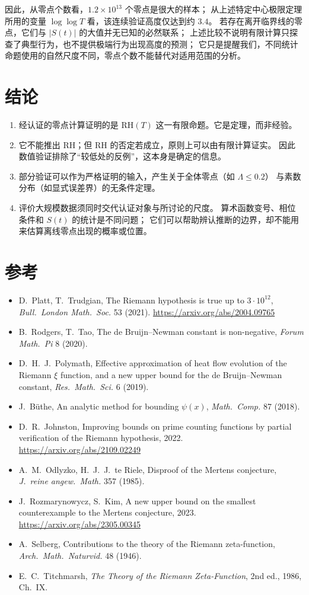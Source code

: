 \documentclass[11pt]{article}
\begin{document}
因此，从零点个数看，$1.2\times10^{13}$ 个零点是很大的样本；
从上述特定中心极限定理所用的变量 $\log\log T$ 看，该连续验证高度仅达到约 $3.4$。
若存在离开临界线的零点，它们与 $|S(t)|$ 的大值并无已知的必然联系；
上述比较不说明有限计算只探查了典型行为，也不提供极端行为出现高度的预测；
它只是提醒我们，不同统计命题使用的自然尺度不同，零点个数不能替代对适用范围的分析。

\section{结论}
\begin{enumerate}
 \item 经认证的零点计算证明的是 $\mathrm{RH}(T)$ 这一有限命题。它是定理，而非经验。
 \item 它不能推出 RH；但 RH 的否定若成立，原则上可以由有限计算证实。
 因此数值验证排除了“较低处的反例”，这本身是确定的信息。
 \item 部分验证可以作为严格证明的输入，产生关于全体零点（如 $\Lambda\le0.2$）
 与素数分布（如显式误差界）的无条件定理。
 \item 评价大规模数据须同时交代认证对象与所讨论的尺度。
 算术函数变号、相位条件和 $S(t)$ 的统计是不同问题；
 它们可以帮助辨认推断的边界，却不能用来估算离线零点出现的概率或位置。
\end{enumerate}

\section*{参考}
\begin{itemize}
 \item D.\ Platt, T.\ Trudgian, The Riemann hypothesis is true up to $3\cdot10^{12}$,
 \emph{Bull.\ London Math.\ Soc.} 53 (2021). \url{https://arxiv.org/abs/2004.09765}
 \item B.\ Rodgers, T.\ Tao, The de Bruijn--Newman constant is non-negative, \emph{Forum Math.\ Pi} 8 (2020).
 \item D.\ H.\ J.\ Polymath, Effective approximation of heat flow evolution of the Riemann $\xi$ function, and a new upper bound for the de Bruijn--Newman constant, \emph{Res.\ Math.\ Sci.} 6 (2019).
 \item J.\ Büthe, An analytic method for bounding $\psi(x)$, \emph{Math.\ Comp.} 87 (2018).
 \item D.\ R.\ Johnston, Improving bounds on prime counting functions by partial verification of the Riemann hypothesis, 2022. \url{https://arxiv.org/abs/2109.02249}
 \item A.\ M.\ Odlyzko, H.\ J.\ J.\ te Riele, Disproof of the Mertens conjecture, \emph{J.\ reine angew.\ Math.} 357 (1985).
 \item J.\ Rozmarynowycz, S.\ Kim, A new upper bound on the smallest counterexample to the Mertens conjecture, 2023. \url{https://arxiv.org/abs/2305.00345}
 \item A.\ Selberg, Contributions to the theory of the Riemann zeta-function, \emph{Arch.\ Math.\ Naturvid.} 48 (1946).
 \item E.\ C.\ Titchmarsh, \emph{The Theory of the Riemann Zeta-Function}, 2nd ed., 1986, Ch.~IX.
\end{itemize}
\end{document}
